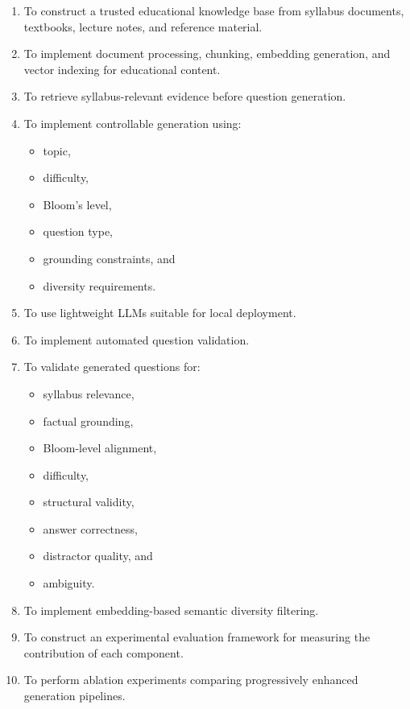 \documentclass[12pt,a4paper]{report}
\begin{document}
\begin{enumerate}

\item To construct a trusted educational knowledge base from syllabus documents, textbooks, lecture notes, and reference material.

\item To implement document processing, chunking, embedding generation, and vector indexing for educational content.

\item To retrieve syllabus-relevant evidence before question generation.

\item To implement controllable generation using:
\begin{itemize}
    \item topic,
    \item difficulty,
    \item Bloom's level,
    \item question type,
    \item grounding constraints, and
    \item diversity requirements.
\end{itemize}

\item To use lightweight LLMs suitable for local deployment.

\item To implement automated question validation.

\item To validate generated questions for:
\begin{itemize}
    \item syllabus relevance,
    \item factual grounding,
    \item Bloom-level alignment,
    \item difficulty,
    \item structural validity,
    \item answer correctness,
    \item distractor quality, and
    \item ambiguity.
\end{itemize}

\item To implement embedding-based semantic diversity filtering.

\item To construct an experimental evaluation framework for measuring the contribution of each component.

\item To perform ablation experiments comparing progressively enhanced generation pipelines.

\end{enumerate}
\end{document}

